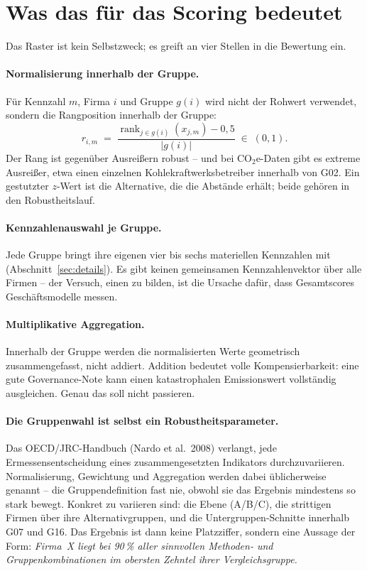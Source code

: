 \documentclass[11pt,a4paper]{article}
\newcommand{\coeq}{\ensuremath{\mathrm{CO}_{2}\mathrm{e}}}
\begin{document}
\section{Was das für das Scoring bedeutet}

Das Raster ist kein Selbstzweck; es greift an vier Stellen in die Bewertung ein.

\paragraph{Normalisierung innerhalb der Gruppe.} Für Kennzahl $m$, Firma $i$ und Gruppe $g(i)$ wird nicht der Rohwert verwendet, sondern die Rangposition innerhalb der Gruppe:
\[
r_{i,m} \;=\; \frac{\operatorname{rank}_{j \in g(i)}\!\left(x_{j,m}\right) - 0{,}5}{\left|g(i)\right|}\;\in\;(0,1).
\]
Der Rang ist gegenüber Ausreißern robust -- und bei \coeq{}-Daten gibt es extreme Ausreißer, etwa einen einzelnen Kohlekraftwerksbetreiber innerhalb von G02. Ein gestutzter $z$-Wert ist die Alternative, die die Abstände erhält; beide gehören in den Robustheitslauf.

\paragraph{Kennzahlenauswahl je Gruppe.} Jede Gruppe bringt ihre eigenen vier bis sechs materiellen Kennzahlen mit (Abschnitt~\ref{sec:details}). Es gibt keinen gemeinsamen Kennzahlenvektor über alle \NFirms{} Firmen -- der Versuch, einen zu bilden, ist die Ursache dafür, dass Gesamtscores Geschäftsmodelle messen.

\paragraph{Multiplikative Aggregation.} Innerhalb der Gruppe werden die normalisierten Werte geometrisch zusammengefasst, nicht addiert. Addition bedeutet volle Kompensierbarkeit: eine gute Governance-Note kann einen katastrophalen Emissionswert vollständig ausgleichen. Genau das soll nicht passieren.

\paragraph{Die Gruppenwahl ist selbst ein Robustheitsparameter.} Das OECD/JRC-Handbuch (Nardo et al.\ 2008) verlangt, jede Ermessensentscheidung eines zusammengesetzten Indikators durchzuvariieren. Normalisierung, Gewichtung und Aggregation werden dabei üblicherweise genannt -- die Gruppendefinition fast nie, obwohl sie das Ergebnis mindestens so stark bewegt. Konkret zu variieren sind: die Ebene (A/B/C), die \NContested{} strittigen Firmen über ihre Alternativgruppen, und die Untergruppen-Schnitte innerhalb G07 und G16. Das Ergebnis ist dann keine Platzziffer, sondern eine Aussage der Form: \emph{Firma~X liegt bei 90\,\% aller sinnvollen Methoden- und Gruppenkombinationen im obersten Zehntel ihrer Vergleichsgruppe.}
\end{document}
